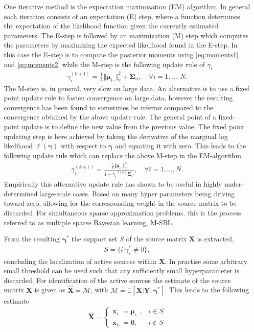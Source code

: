 One iterative method is the expectation maximisation (EM) algorithm.
In general each iteration consists of an expectation (E) step, where a function determines the expectation of the likelihood function given the currently estimated parameters. The E-step is followed by an maximization (M) step which computes the parameters by maximizing the expected likelihood found in the E-step.
In this case the E-step is to compute the posterior moments using \eqref{eq:moments1} and \eqref{eq:moments2} while the M-step is the following update rule of $\gamma_i$ \cite[p.147]{phd_wipf}
\begin{align*}
\gamma_i^{(k+1)} = \frac{1}{L} \Vert \boldsymbol{\mu}_{i \cdot} \Vert_2^2 + \boldsymbol{\Sigma}_{ii}, \quad \forall i = 1, \dots, N.
\end{align*}
The M-step is, in general, very slow on large data. 
An alternative is to use a fixed point update rule to fasten convergence on large data, however the resulting convergence has been found to sometimes be inferior compared to the convergence obtained by the above update rule\cite[p.147]{phd_wipf}. The general point of a fixed-point update is to define the new value from the previous value. 
The fixed point updating step is here achieved by taking the derivative of the marginal log likelihood $\ell(\boldsymbol{\gamma})$ with respect to $\boldsymbol{\gamma}$ and equating it with zero. 
This leads to the following update rule which can replace the above M-step in the EM-algorithm \cite[p.147]{phd_wipf}
\begin{align}
\gamma_i^{(k+1)} = \frac{\frac{1}{L} \Vert \boldsymbol{\mu}_{i \cdot} \Vert_2^2}{1 - \gamma_i^{-1 (k)} \boldsymbol{\Sigma}_{ii}}, \quad \forall i = 1, \dots, N.
\end{align}
Empirically this alternative update rule has shown to be useful in highly under-determined large-scale cases. Based on many hyper parameters being driving toward zero, allowing for the corresponding weight in the source matrix to be discarded. 
For simultaneous sparse approximation problems, this is the process referred to as multiple sparse Bayesian learning, M-SBL.

From the resulting $\boldsymbol{\gamma}^\ast$ the support set $S$ of the source matrix $\mathbf{X}$ is extracted, 
\begin{align*}
S = \{ i \vert \gamma_i^{\ast} \neq 0 \},
\end{align*}
concluding the localization of active sources within $\mathbf{X}$. 
In practise some arbitrary small threshold can be used such that any sufficiently small hyperparameter is discarded\cite[p.149]{phd_wipf}.
For identification of the active sources the estimate of the source matrix $\mathbf{X}$ is given as $\hat{\mathbf{X}} = \mathcal{M} $, with $\mathcal{M} = \mathbb{E}[\mathbf{X}\vert \mathbf{Y} ; \boldsymbol{\gamma}^{\ast}]$. 
This leads to the following estimate  
\begin{align*}
\hat{\mathbf{X}} = 
\begin{cases}
\mathbf{x}_{i\cdot} = \boldsymbol{\mu}_{i \cdot}, & i \in S \\
\mathbf{x}_{i\cdot} = \mathbf{0}, & i \not \in S
\end{cases}
\end{align*}


